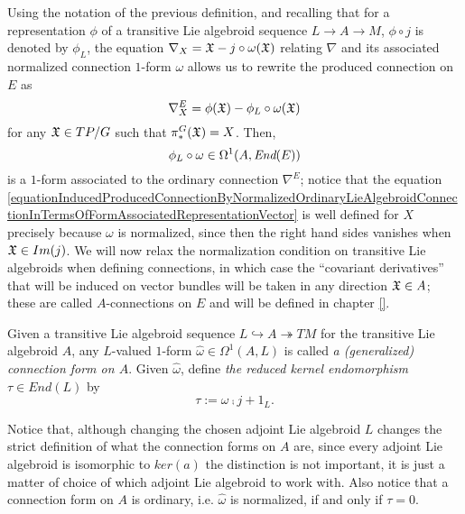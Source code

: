 Using the notation of the previous definition, and recalling that for a representation $\phi$ of a transitive Lie algebroid sequence $L \to A \to M$, $\phi \circ j$ is denoted by $\phi_L$, the equation $\nabla_X = \mathfrak{X} - j \circ \omega(\mathfrak{X})$ relating $\nabla$ and its associated normalized connection $1$-form $\omega$ allows us to rewrite the produced connection on $E$ as
\begin{equation}\label{equationInducedProducedConnectionByNormalizedOrdinaryLieAlgebroidConnectionInTermsOfFormAssociatedRepresentationVector}
    \nabla^E_X = \phi(\oid X) - \phi_L \circ \omega(\oid X)
\end{equation}
for any $\mathfrak{X} \in TP/G$ such that $\pi_*^G(\mathfrak{X}) = X$. Then, 
\begin{equation}
    \phi_L \circ \omega \in \Omega^1(A, \End(E))
\end{equation} 
is a $1$-form associated to the ordinary connection $\nabla^E$; notice that the equation \eqref{equationInducedProducedConnectionByNormalizedOrdinaryLieAlgebroidConnectionInTermsOfFormAssociatedRepresentationVector} is well defined for $X$ precisely because $\omega$ is normalized, since then the right hand sides vanishes when $\mathfrak{X} \in Im(j)$. We will now relax the normalization condition on transitive Lie algebroids when defining connections, in which case the ``covariant derivatives'' that will be induced on vector bundles will be taken in any direction $\mathfrak{X} \in A$; these are called $A$-connections on $E$ and will be defined in chapter \ref{}.

\linea

\begin{definition}\label{definitionGeneralizedConnectionFOrmOnTransitiveLieAlgebroidAndTauReducedKernelEndomorphism}
Given a transitive Lie algebroid sequence $L \hookrightarrow A \twoheadrightarrow TM$ for the transitive Lie algebroid $A$, any $L$-valued $1$-form $\hat \omega \in \Omega^1(A, L)$ is called \emph{a (generalized) connection form on $A$}. Given $\hat \omega$, define \emph{the reduced kernel endomorphism $\tau \in End(L)$} by
\begin{equation}
    \tau := \omega \comp j + 1_L.
\end{equation}
\end{definition}

Notice that, although changing the chosen adjoint Lie algebroid $L$ changes the strict definition of what the connection forms on $A$ are, since every adjoint Lie algebroid is isomorphic to $ker(a)$ the distinction is not important, it is just a matter of choice of which adjoint Lie algebroid to work with. Also notice that a connection form on $A$ is ordinary, i.e. $\hat \omega$ is normalized, if and only if $\tau = 0$.

